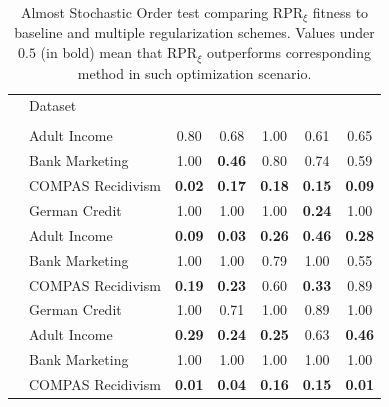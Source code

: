 \begin{table}[ht]
    \centering
    \caption{Almost Stochastic Order test comparing RPR$_\xi$ fitness to baseline and multiple regularization schemes. Values under $0.5$ (in bold) mean that RPR$_\xi$ outperforms corresponding method in such optimization scenario.} \label{tab:aso_compare_rpr_variations}
    {\footnotesize
    \begin{tabular}{llccccc}
    \toprule
      & Dataset &  &  &  &  &  \\ \\
 & Adult Income & 0.80 & 0.68 & 1.00 & 0.61 & 0.65 \\
 & Bank Marketing & 1.00 & \textbf{0.46} & 0.80 & 0.74 & 0.59 \\
 & COMPAS Recidivism & \textbf{0.02} & \textbf{0.17} & \textbf{0.18} & \textbf{0.15} & \textbf{0.09} \\
 & German Credit & 1.00 & 1.00 & 1.00 & \textbf{0.24} & 1.00 \\
\midrule
{} 
 & Adult Income & \textbf{0.09} & \textbf{0.03} & \textbf{0.26} & \textbf{0.46} & \textbf{0.28} \\
 & Bank Marketing & 1.00 & 1.00 & 0.79 & 1.00 & 0.55 \\
 & COMPAS Recidivism & \textbf{0.19} & \textbf{0.23} & 0.60 & \textbf{0.33} & 0.89 \\
 & German Credit & 1.00 & 0.71 & 1.00 & 0.89 & 1.00 \\
\midrule
{} 
 & Adult Income & \textbf{0.29} & \textbf{0.24} & \textbf{0.25} & 0.63 & \textbf{0.46} \\
 & Bank Marketing & 1.00 & 1.00 & 1.00 & 1.00 & 1.00 \\
 & COMPAS Recidivism & \textbf{0.01} & \textbf{0.04} & \textbf{0.16} & \textbf{0.15} & \textbf{0.01} \\

\end{tabular}}
\end{table}
